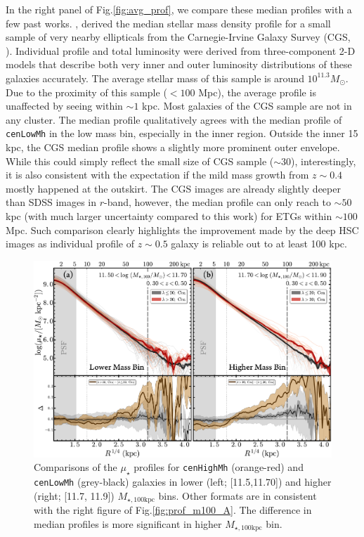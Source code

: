 \documentclass{emulateapj}
\def\rbcg{\texttt{cenHighMh}}
\def\nbcg{\texttt{cenLowMh}}
\def\mtot{{$M_{\star,100\mathrm{kpc}}$}}
\def\mden{{$\mu_{\star}$}}
\begin{document}
\begin{CJK*}{UTF8}{gbsn}
    In the right panel of Fig.\ref{fig:avg_prof}, we compare these median 
    profiles with a few past works.  
    \citep{Huang2013a}, derived the median stellar mass density profile 
    for a small sample of very nearby ellipticals from the 
    Carnegie-Irvine Galaxy Survey (CGS, \citealt{CGS1}).
    Individual profile and total luminosity were derived from 
    three-component 2-D models that describe both very inner and outer 
    luminosity distributions of these galaxies accurately. 
    The average stellar mass of this sample is around $10^{11.3} M_{\odot}$.
    Due to the proximity of this sample ($< 100$ Mpc), the average profile 
    is unaffected by seeing within $\sim 1$ kpc.
    Most galaxies of the CGS sample are not in any cluster.
    The median profile qualitatively agrees with the median profile of 
    \nbcg{} in the low mass bin, especially in the inner region. 
    Outside the inner 15 kpc, the CGS median profile shows a slightly more
    prominent outer envelope.  
    While this could simply reflect the small size of CGS sample ($\sim 30$),
    interestingly, it is also consistent with the expectation if the 
    mild mass growth from $z\sim 0.4$ mostly happened at the outskirt.   
    The CGS images are already slightly deeper than SDSS images in $r$-band,
    however, the median profile can only reach to $\sim 50$ kpc (with much 
    larger uncertainty compared to this work) for ETGs within $\sim 100$ Mpc.
    Such comparison clearly highlights the improvement made by the deep HSC 
    images as individual profile of $z\sim 0.5$ galaxy is reliable out to 
    at least 100 kpc.  
    
  \begin{figure}[t]
      \centering 
      \includegraphics[width=14.0cm]{fig/redbcg_prof_m100C}
      \caption{Comparisons of the \mden{} profiles for \rbcg{} (orange-red) and \nbcg{} 
      	(grey-black) galaxies in lower (left; [11.5,11.70]) and higher 
        (right; [11.7, 11.9]) \mtot{} bins. 
        Other formats are in consistent with the right figure of 
        Fig.\ref{fig:prof_m100_A}.
        The difference in median profiles is more significant in higher \mtot{} bin.}
      \label{fig:prof_m100_C}
  \end{figure}


\end{CJK*}
\end{document}

